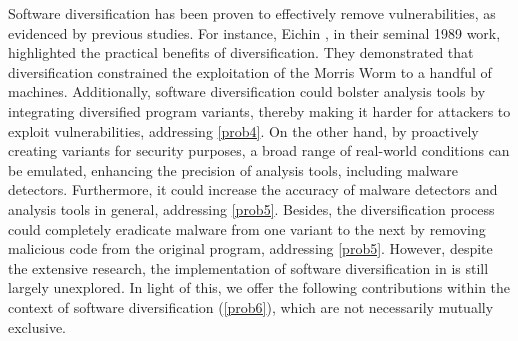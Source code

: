 Software diversification has been proven to effectively remove vulnerabilities, as evidenced by previous studies. 
For instance, Eichin \etal \cite{36307}, in their seminal 1989 work, highlighted the practical benefits of diversification. 
They demonstrated that diversification constrained the exploitation of the Morris Worm to a handful of machines. 
Additionally, software diversification could bolster \Wasm analysis tools by integrating diversified program variants, thereby making it harder for attackers to exploit vulnerabilities, addressing \ref{prob4}. 
On the other hand, by proactively creating variants for security purposes, a broad range of real-world conditions can be emulated, enhancing the precision of \Wasm analysis tools, including \Wasm malware detectors. 
Furthermore, it could increase the accuracy of \Wasm malware detectors and \Wasm analysis tools in general, addressing \ref{prob5}. 
Besides, the diversification process could completely eradicate malware from one variant to the next by removing malicious code from the original program, addressing \ref{prob5}. 
However, despite the extensive research, the implementation of software diversification in \Wasm is still largely unexplored. 
In light of this, we offer the following contributions within the context of software diversification (\ref{prob6}), which are not necessarily mutually exclusive.


